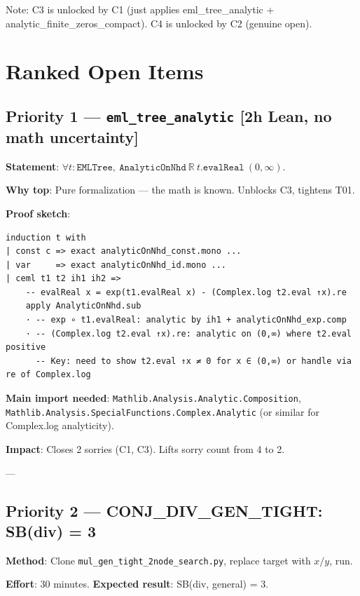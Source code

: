\documentclass[12pt]{article}
\theoremstyle{definition}
\begin{document}
Note: C3 is unlocked by C1 (just applies eml\_tree\_analytic + analytic\_finite\_zeros\_compact).
C4 is unlocked by C2 (genuine open).

\section{Ranked Open Items}

\subsection{Priority 1 — \texttt{eml\_tree\_analytic} [2h Lean, no math uncertainty]}
\label{sec:p1}

\textbf{Statement}: $\forall t : \texttt{EMLTree},\ \texttt{AnalyticOnNhd}\ \mathbb{R}\ t.\texttt{evalReal}\ (0, \infty)$.

\textbf{Why top}: Pure formalization — the math is known. Unblocks C3, tightens T01.

\textbf{Proof sketch}:
\begin{verbatim}
induction t with
| const c => exact analyticOnNhd_const.mono ...
| var     => exact analyticOnNhd_id.mono ...
| ceml t1 t2 ih1 ih2 =>
    -- evalReal x = exp(t1.evalReal x) - (Complex.log t2.eval ↑x).re
    apply AnalyticOnNhd.sub
    · -- exp ∘ t1.evalReal: analytic by ih1 + analyticOnNhd_exp.comp
    · -- (Complex.log t2.eval ↑x).re: analytic on (0,∞) where t2.eval positive
      -- Key: need to show t2.eval ↑x ≠ 0 for x ∈ (0,∞) or handle via re of Complex.log
\end{verbatim}

\textbf{Main import needed}: \texttt{Mathlib.Analysis.Analytic.Composition},
\texttt{Mathlib.Analysis.SpecialFunctions.Complex.Analytic} (or similar for Complex.log analyticity).

\textbf{Impact}: Closes 2 sorries (C1, C3). Lifts sorry count from 4 to 2.

---

\subsection{Priority 2 — CONJ\_DIV\_GEN\_TIGHT: SB(div) = 3}

\textbf{Method}: Clone \texttt{mul\_gen\_tight\_2node\_search.py}, replace target with $x/y$, run.

\textbf{Effort}: 30 minutes.  \textbf{Expected result}: SB(div, general) = 3.
\end{document}
